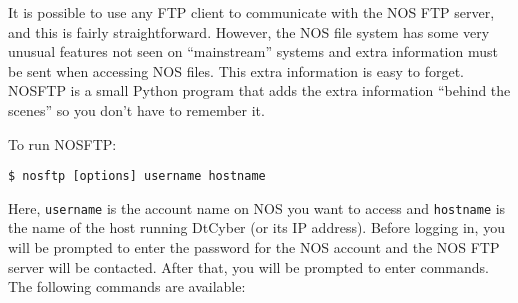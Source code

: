 \documentclass[a4paper,twoside,11pt]{article}
\newcommand{\newpara}{\par\vspace{4mm}\noindent}
\newcommand{\textttc}[1]{\texttt{\textcolor{OurRed}{#1}}}
\begin{document}
\newpara
It is possible to use any FTP client to communicate with the NOS FTP server, and this is
fairly straightforward. However, the NOS file system has some very unusual features not seen
on ``mainstream'' systems and extra information must be sent when accessing NOS files. This
extra information is easy to forget. NOSFTP is a small Python program that adds the extra
information ``behind the scenes'' so you don't have to remember it.

\newpara
To run NOSFTP:
\begin{lstlisting}
$ nosftp [options] username hostname
\end{lstlisting}
Here, \textttc{username} is the account name on NOS you want to access and \texttt{hostname} is the name of the host
running DtCyber (or its IP address). Before logging in, you will be prompted to enter the password for the
NOS account and the NOS FTP server will be contacted. After that, you will be prompted to enter
commands. The following commands are available:
\end{document}
